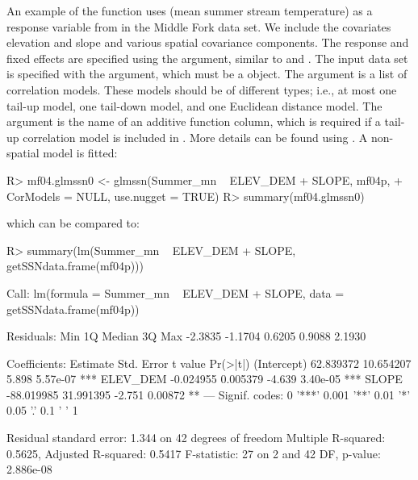 \documentclass[nojss]{jss}
\renewenvironment{Schunk}{\vspace{\topsep}}{\vspace{\topsep}}
\begin{document}
An example of the  function uses  (mean
summer stream temperature) as a response variable from in the Middle
Fork data set. We include the covariates elevation and slope and
various spatial covariance components. The response and fixed effects
are specified using the  argument, similar to 
and . The input data set is specified with the 
argument, which must be a  object. The
 argument is a list of correlation models. These
models should be of different types; i.e., at most one tail-up model,
one tail-down model, and one Euclidean distance model. The
 argument is the name of an additive function column,
which is required if a tail-up correlation model is included in
. More details can be found using
. A non-spatial model is fitted:

\begin{Schunk}
\begin{Sinput}
R> mf04.glmssn0 <- glmssn(Summer_mn ~ ELEV_DEM + SLOPE, mf04p,
+     CorModels = NULL, use.nugget = TRUE)
R> summary(mf04.glmssn0)
\end{Sinput}
\end{Schunk}

which can be compared to:

\begin{Schunk}
\begin{Sinput}
R> summary(lm(Summer_mn ~ ELEV_DEM + SLOPE, getSSNdata.frame(mf04p)))
\end{Sinput}
\begin{Soutput}
Call:
lm(formula = Summer_mn ~ ELEV_DEM + SLOPE, data = getSSNdata.frame(mf04p))

Residuals:
    Min      1Q  Median      3Q     Max 
-2.3835 -1.1704  0.6205  0.9088  2.1930 

Coefficients:
              Estimate Std. Error t value Pr(>|t|)    
(Intercept)  62.839372  10.654207   5.898 5.57e-07 ***
ELEV_DEM     -0.024955   0.005379  -4.639 3.40e-05 ***
SLOPE       -88.019985  31.991395  -2.751  0.00872 ** 
---
Signif. codes:  0 '***' 0.001 '**' 0.01 '*' 0.05 '.' 0.1 ' ' 1

Residual standard error: 1.344 on 42 degrees of freedom
Multiple R-squared:  0.5625,	Adjusted R-squared:  0.5417 
F-statistic:    27 on 2 and 42 DF,  p-value: 2.886e-08
\end{Soutput}
\end{Schunk}
\end{document}
